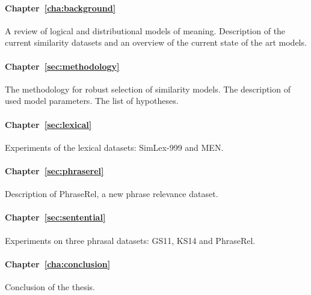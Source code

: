 \paragraph{Chapter~\ref{cha:background}} A review of logical and distributional models of meaning. Description of the current similarity datasets and an overview of the current state of the art models.

\paragraph{Chapter~\ref{sec:methodology}} The methodology for robust selection of similarity models. The description of used model parameters. The list of hypotheses.

\paragraph{Chapter~\ref{sec:lexical}} Experiments of the lexical datasets: SimLex-999 and MEN.

\paragraph{Chapter~\ref{sec:phraserel}} Description of PhraseRel, a new phrase relevance dataset.

\paragraph{Chapter~\ref{sec:sentential}} Experiments on three phrasal datasets: GS11, KS14 and PhraseRel.

\paragraph{Chapter~\ref{cha:conclusion}} Conclusion of the thesis.

